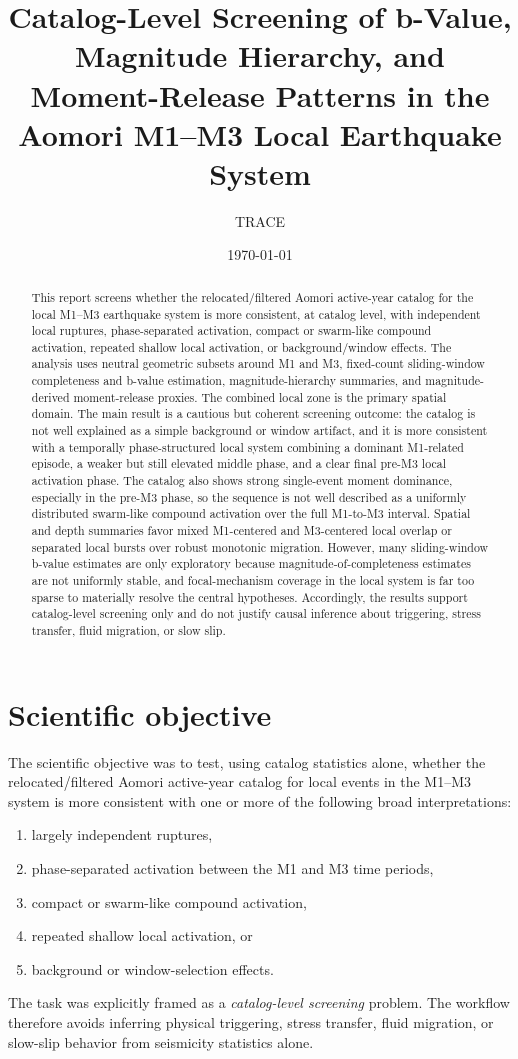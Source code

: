 \documentclass[11pt]{article}
\title{Catalog-Level Screening of b-Value, Magnitude Hierarchy, and Moment-Release Patterns in the Aomori M1--M3 Local Earthquake System}
\author{TRACE}
\date{\today}
\begin{document}
\maketitle

\begin{abstract}
This report screens whether the relocated/filtered Aomori active-year catalog for the local M1--M3 earthquake system is more consistent, at catalog level, with independent local ruptures, phase-separated activation, compact or swarm-like compound activation, repeated shallow local activation, or background/window effects. The analysis uses neutral geometric subsets around M1 and M3, fixed-count sliding-window completeness and b-value estimation, magnitude-hierarchy summaries, and magnitude-derived moment-release proxies. The combined local zone is the primary spatial domain. The main result is a cautious but coherent screening outcome: the catalog is not well explained as a simple background or window artifact, and it is more consistent with a temporally phase-structured local system combining a dominant M1-related episode, a weaker but still elevated middle phase, and a clear final pre-M3 local activation phase. The catalog also shows strong single-event moment dominance, especially in the pre-M3 phase, so the sequence is not well described as a uniformly distributed swarm-like compound activation over the full M1-to-M3 interval. Spatial and depth summaries favor mixed M1-centered and M3-centered local overlap or separated local bursts over robust monotonic migration. However, many sliding-window b-value estimates are only exploratory because magnitude-of-completeness estimates are not uniformly stable, and focal-mechanism coverage in the local system is far too sparse to materially resolve the central hypotheses. Accordingly, the results support catalog-level screening only and do not justify causal inference about triggering, stress transfer, fluid migration, or slow slip.
\end{abstract}

\section{Scientific objective}
The scientific objective was to test, using catalog statistics alone, whether the relocated/filtered Aomori active-year catalog for local events in the M1--M3 system is more consistent with one or more of the following broad interpretations:
\begin{enumerate}[leftmargin=2em]
    \item largely independent ruptures,
    \item phase-separated activation between the M1 and M3 time periods,
    \item compact or swarm-like compound activation,
    \item repeated shallow local activation, or
    \item background or window-selection effects.
\end{enumerate}
The task was explicitly framed as a \emph{catalog-level screening} problem. The workflow therefore avoids inferring physical triggering, stress transfer, fluid migration, or slow-slip behavior from seismicity statistics alone.
\end{document}
